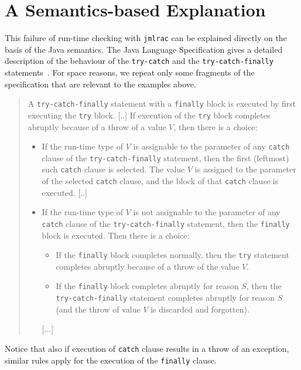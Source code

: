 \documentclass[]{llncs}
\begin{document}
\section{A Semantics-based Explanation}\label{SecExplanation}

This failure of run-time checking with \texttt{jmlrac} can be
explained directly on the basis of the Java semantics. The Java
Language Specification gives a detailed description of the behaviour
of the
\texttt{try-catch} and the 
\texttt{try-catch-finally} statements~\cite[\S
14.20]{GoslingJSB05}. For space reasons, we repeat only some fragments of
the specification that are relevant to the examples above.

\begin{quotation}
A \texttt{try-catch-finally} statement with a \texttt{finally} block
is executed by first executing the \texttt{try} block. [..]  If
execution of the \texttt{try} block completes abruptly because of a
throw of a value \(V\), then there is a choice:
\begin{itemize}
\item If the run-time type of \(V\) is assignable to the parameter of
any \texttt{catch} clause of the \texttt{try-catch-finally} statement,
then the first (leftmost) such \texttt{catch} clause is selected. The
value \(V\) is assigned to the parameter of the selected
\texttt{catch} clause, and the block of that \texttt{catch} clause is
executed. [..]

\item If the run-time type of \(V\) is not assignable to the parameter
of any \texttt{catch} clause of the \texttt{try-catch-finally}
statement, then the \texttt{finally} block is executed. Then there is
a choice:

\begin{itemize}
\item If the \texttt{finally} block completes normally, then the \texttt{try}
statement completes abruptly because of a throw of the value \(V\).
\item If the \texttt{finally} block completes abruptly for reason
\(S\), then the \texttt{try-catch-finally} statement completes
abruptly for reason \(S\) (and the throw of value \(V\) is discarded
and forgotten).
\end{itemize} 
[...]
\end{itemize}
\end{quotation}

Notice that also if execution of \texttt{catch} clause results in a
throw of an exception, similar rules apply for the execution of the
\texttt{finally} clause.
\end{document}
